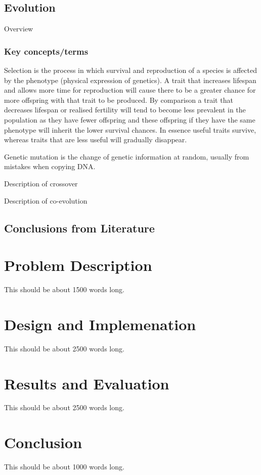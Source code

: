 \documentclass[authoryearcitations]{UoYCSproject}
\begin{document}
\newpage
\section{Evolution}
Overview \cite{origin1859}

\subsection{Key concepts/terms}
\begin{description}[style=nextline]
\item[Selection] Selection is the process in which survival and reproduction of a species is affected by the phenotype (physical expression of genetics). A trait that increases lifespan and allows more time for reproduction will cause there to be a greater chance for more offspring with that trait to be produced. By comparison a trait that decreases lifespan or realised fertility will tend to become less prevalent in the population as they have fewer offspring and these offspring if they have the same phenotype will inherit the lower survival chances. In essence useful traits survive, whereas traits that are less useful will gradually disappear.

\item [Mutation] Genetic mutation is the change of genetic information at random, usually from mistakes when copying DNA. 

\item [Crossover] Description of crossover

\item [Coevolution] Description of co-evolution
\end{description}

\section{Conclusions from Literature}


\chapter{Problem Description}
\label{cha:Problem Description}
This should be about 1500 words long.

\chapter{Design and Implemenation}
\label{cha:Design and Implementation}
This should be about 2500 words long.

\chapter{Results and Evaluation}
\label{cha:Results and Evaluation}
This should be about 2500 words long.

\chapter{Conclusion}
\label{cha:Conclusion}
This should be about 1000 words long.


 
\end{document}

